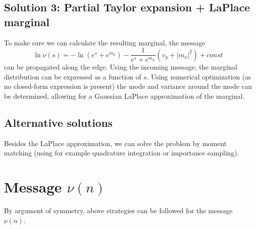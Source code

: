 \subsection{Solution 3: Partial Taylor expansion + LaPlace marginal}
To make sure we can calculate the resulting marginal, the message
\begin{equation}
    \ln \nu(s) = -\ln(e^s + e^{m_n}) - \frac{1}{e^s + e^{m_n}} (v_y + |m_x|^2) + \textit{const}
\end{equation}
can be propagated along the edge. Using the incoming message, the marginal distribution can be expressed as a function of $s$. Using numerical optimization (as no closed-form expression is present) the mode and variance around the mode can be determined, allowing for a Gaussian LaPlace approximation of the marginal.

\subsection{Alternative solutions}
Besides the LaPlace approximation, we can solve the problem by moment matching (using for example quadrature integration or importance sampling).


\section{Message $\nu(n)$}
By argument of symmetry, above strategies can be followed for the message $\nu(n)$.